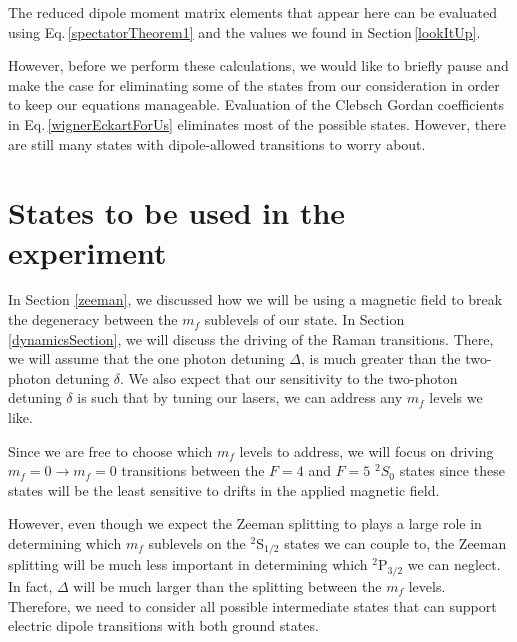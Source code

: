 The reduced dipole moment matrix elements that appear here can be evaluated using Eq.\,\ref{spectatorTheorem1} and the values we found in Section\,\ref{lookItUp}. 

However, before we perform these calculations, we would like to briefly pause and make the case for eliminating some of the states from our consideration in order to keep our equations manageable. 
Evaluation of the Clebsch Gordan coefficients in Eq.\,\ref{wignerEckartForUs} eliminates most of the possible states. However, there are still many states with dipole-allowed transitions to worry about. 

\section{States to be used in the experiment}
\label{figureOutStatesSection}

In Section \ref{zeeman}, we discussed how we will be using a magnetic field to break the degeneracy between the $m_f$ sublevels of our state.
In Section \ref{dynamicsSection}, we will discuss the driving of the Raman transitions. There, we will assume that the one photon detuning $\Delta$, is much greater than the two-photon detuning $\delta$. We also expect that our sensitivity to the two-photon detuning $\delta$ is such that by tuning our lasers, we can address any $m_f$ levels we like.

Since we are free to choose which $m_f$ levels to address, we will focus on driving $m_f=0\rightarrow m_f=0$ transitions between the $F=4$ and $F=5$ $^2 S_{0}$ states since these states will be the least sensitive to drifts in the applied magnetic field. 

However, even though we expect the Zeeman splitting to plays a large role in determining which $m_f$ sublevels on the $^2$S$_{1/2}$ states we can couple to, the Zeeman splitting will be much less important in determining which $^2$P$_{3/2}$ we can neglect. In fact, $\Delta$ will be much larger than the splitting between the $m_f$ levels. Therefore, we need to consider all possible intermediate states that can support electric dipole transitions with both ground states. %


